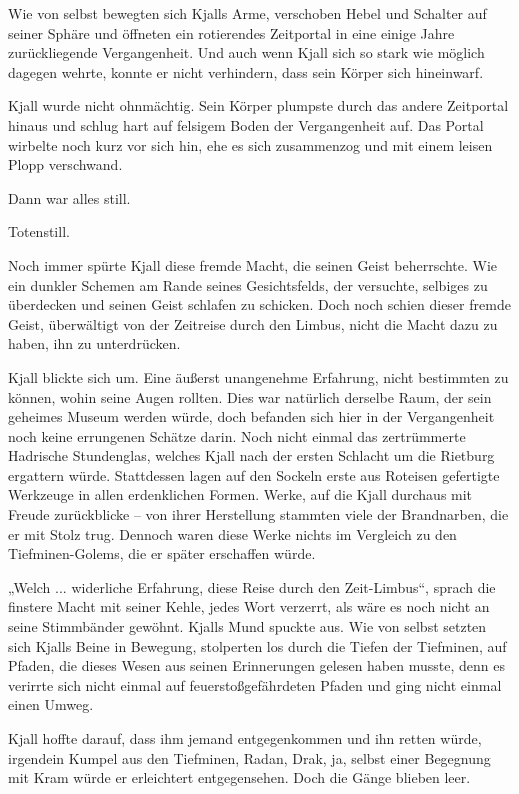 Wie von selbst bewegten sich Kjalls Arme, verschoben Hebel und Schalter auf seiner Sphäre und öffneten ein rotierendes Zeitportal in eine einige Jahre zurückliegende Vergangenheit. Und auch wenn Kjall sich so stark wie möglich dagegen wehrte, konnte er nicht verhindern, dass sein Körper sich hineinwarf.






Kjall wurde nicht ohnmächtig. Sein Körper plumpste durch das andere Zeitportal hinaus und schlug hart auf felsigem Boden der Vergangenheit auf. Das Portal wirbelte noch kurz vor sich hin, ehe es sich zusammenzog und mit einem leisen Plopp verschwand.

Dann war alles still.

Totenstill.

Noch immer spürte Kjall diese fremde Macht, die seinen Geist beherrschte. Wie ein dunkler Schemen am Rande seines Gesichtsfelds, der versuchte, selbiges zu überdecken und seinen Geist schlafen zu schicken. Doch noch schien dieser fremde Geist, überwältigt von der Zeitreise durch den Limbus, nicht die Macht dazu zu haben, ihn zu unterdrücken.

Kjall blickte sich um. Eine äußerst unangenehme Erfahrung, nicht bestimmten zu können, wohin seine Augen rollten. Dies war natürlich derselbe Raum, der sein geheimes Museum werden würde, doch befanden sich hier in der Vergangenheit noch keine errungenen Schätze darin. Noch nicht einmal das zertrümmerte Hadrische Stundenglas, welches Kjall nach der ersten Schlacht um die Rietburg ergattern würde. Stattdessen lagen auf den Sockeln erste aus Roteisen gefertigte Werkzeuge in allen erdenklichen Formen. Werke, auf die Kjall durchaus mit Freude zurückblicke – von ihrer Herstellung stammten viele der Brandnarben, die er mit Stolz trug. Dennoch waren diese Werke nichts im Vergleich zu den Tiefminen-Golems, die er später erschaffen würde.

„Welch ... widerliche Erfahrung, diese Reise durch den Zeit-Limbus“, sprach die finstere Macht mit seiner Kehle, jedes Wort verzerrt, als wäre es noch nicht an seine Stimmbänder gewöhnt. Kjalls Mund spuckte aus. Wie von selbst setzten sich Kjalls Beine in Bewegung, stolperten los durch die Tiefen der Tiefminen, auf Pfaden, die dieses Wesen aus seinen Erinnerungen gelesen haben musste, denn es verirrte sich nicht einmal auf feuerstoßgefährdeten Pfaden und ging nicht einmal einen Umweg.

Kjall hoffte darauf, dass ihm jemand entgegenkommen und ihn retten würde, irgendein Kumpel aus den Tiefminen, Radan, Drak, ja, selbst einer Begegnung mit Kram würde er erleichtert entgegensehen. Doch die Gänge blieben leer.

